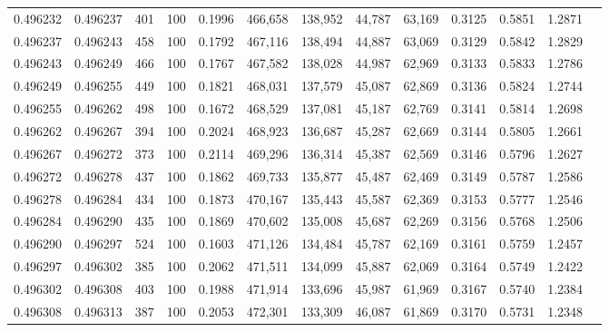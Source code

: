 \begin{tabular}{rrrrrrrrrrrrr}
0.496232 & 0.496237 &   401 & 100 &                                     0.1996 & 466,658 & 138,952 &  44,787 &  63,169 & 0.3125 & 0.5851 & 1.2871 \\
0.496237 & 0.496243 &   458 & 100 &                                     0.1792 & 467,116 & 138,494 &  44,887 &  63,069 & 0.3129 & 0.5842 & 1.2829 \\
0.496243 & 0.496249 &   466 & 100 &                                     0.1767 & 467,582 & 138,028 &  44,987 &  62,969 & 0.3133 & 0.5833 & 1.2786 \\
0.496249 & 0.496255 &   449 & 100 &                                     0.1821 & 468,031 & 137,579 &  45,087 &  62,869 & 0.3136 & 0.5824 & 1.2744 \\
0.496255 & 0.496262 &   498 & 100 &                                     0.1672 & 468,529 & 137,081 &  45,187 &  62,769 & 0.3141 & 0.5814 & 1.2698 \\
0.496262 & 0.496267 &   394 & 100 &                                     0.2024 & 468,923 & 136,687 &  45,287 &  62,669 & 0.3144 & 0.5805 & 1.2661 \\
0.496267 & 0.496272 &   373 & 100 &                                     0.2114 & 469,296 & 136,314 &  45,387 &  62,569 & 0.3146 & 0.5796 & 1.2627 \\
0.496272 & 0.496278 &   437 & 100 &                                     0.1862 & 469,733 & 135,877 &  45,487 &  62,469 & 0.3149 & 0.5787 & 1.2586 \\
0.496278 & 0.496284 &   434 & 100 &                                     0.1873 & 470,167 & 135,443 &  45,587 &  62,369 & 0.3153 & 0.5777 & 1.2546 \\
0.496284 & 0.496290 &   435 & 100 &                                     0.1869 & 470,602 & 135,008 &  45,687 &  62,269 & 0.3156 & 0.5768 & 1.2506 \\
0.496290 & 0.496297 &   524 & 100 &                                     0.1603 & 471,126 & 134,484 &  45,787 &  62,169 & 0.3161 & 0.5759 & 1.2457 \\
0.496297 & 0.496302 &   385 & 100 &                                     0.2062 & 471,511 & 134,099 &  45,887 &  62,069 & 0.3164 & 0.5749 & 1.2422 \\
0.496302 & 0.496308 &   403 & 100 &                                     0.1988 & 471,914 & 133,696 &  45,987 &  61,969 & 0.3167 & 0.5740 & 1.2384 \\
0.496308 & 0.496313 &   387 & 100 &                                     0.2053 & 472,301 & 133,309 &  46,087 &  61,869 & 0.3170 & 0.5731 & 1.2348 \\

\end{tabular}
